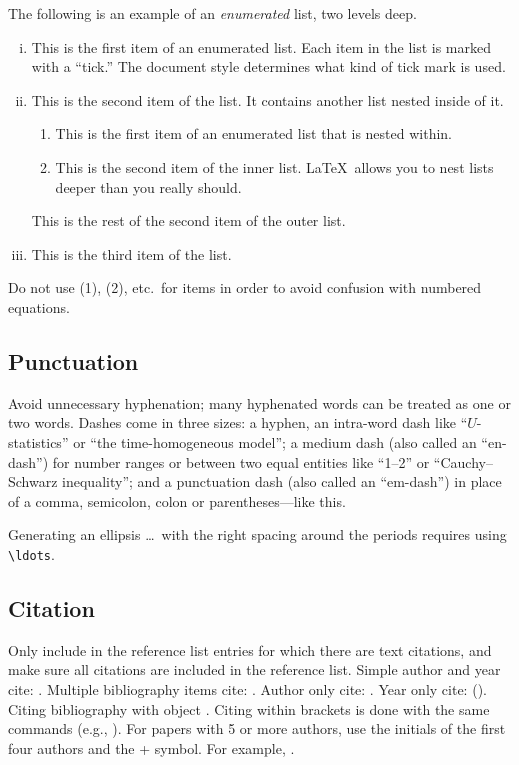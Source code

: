 \documentclass[ecta,nameyear,final,supplement]{econsocart}
\theoremstyle{plain}
\theoremstyle{definition}
\begin{document}
The following is an example of an \emph{enumerated} list, two levels deep.
\begin{enumerate}[(ii)]
\item[(i)]
This is the first item of an enumerated list.  Each item
in the list is marked with a ``tick.''  The document
style determines what kind of tick mark is used.
\item[(ii)]
This is the second item of the list.  It contains another
list nested inside of it.
\begin{enumerate}
\item
This is the first item of an enumerated list that
is nested within.
\item
This is the second item of the inner list.  \LaTeX\
allows you to nest lists deeper than you really should.
\end{enumerate}
This is the rest of the second item of the outer list.
\item [(iii)]
This is the third item of the list.
\end{enumerate}

Do not use (1), (2), etc.\ for items in order to avoid confusion with numbered equations.

\subsection{Punctuation}
Avoid unnecessary hyphenation; many hyphenated words can be treated as one or two words.
Dashes come in three sizes: a hyphen, an intra-word dash like ``$U$-statistics'' or ``the time-homogeneous model'';
a medium dash (also called an ``en-dash'') for number ranges or between two equal entities like ``1--2'' or ``Cauchy--Schwarz inequality'';
and a punctuation dash (also called an ``em-dash'') in place of a comma, semicolon,
colon or parentheses---like this.

Generating an ellipsis \ldots\ with the right spacing
around the periods requires using \verb|\ldots|.

\subsection{Citation}
Only include in the reference list entries for which there are text citations,
and make sure all citations are included in the reference list.
Simple author and year cite: \citet{b1}. 
Multiple bibliography items cite: \citet{b2,b3,b5,b6}.
Author only cite: \citeauthor{b3}.
Year only cite: (\citeyear{b3}). Citing bibliography with object \citet[Theorem 1]{b1}. Citing within brackets is done with the same commands (e.g., \citet{b2,b3,b5}). For papers with 5 or more authors, use the initials of the first four authors and the + symbol. For example, \citet{b4}.
\end{document}
